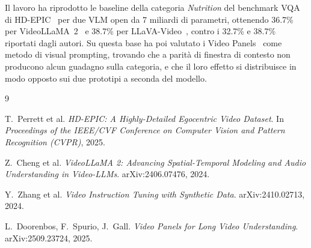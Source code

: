 \documentclass{article}
\begin{document}
Il lavoro ha riprodotto le baseline della categoria \emph{Nutrition} del
benchmark VQA di HD-EPIC~\cite{hdepic} per due VLM open da 7 miliardi di parametri, ottenendo
36.7\% per VideoLLaMA~2~\cite{videollama2} e 38.7\% per LLaVA-Video~\cite{llavavideo}, contro i 32.7\% e 38.7\%
riportati dagli autori. Su questa base ha poi valutato
i Video Panels~\cite{videopanels} come metodo di visual prompting, trovando che a parità di finestra
di contesto non producono alcun guadagno sulla categoria, e che il loro effetto
si distribuisce in modo opposto sui due prototipi a seconda del modello.

\begin{thebibliography}{9}

T.~Perrett et al.
\newblock \emph{HD-EPIC: A Highly-Detailed Egocentric Video Dataset}.
\newblock In \emph{Proceedings of the IEEE/CVF Conference on Computer Vision and
Pattern Recognition (CVPR)}, 2025.

Z.~Cheng et al.
\newblock \emph{VideoLLaMA 2: Advancing Spatial-Temporal Modeling and Audio
Understanding in Video-LLMs}.
\newblock arXiv:2406.07476, 2024.

Y.~Zhang et al.
\newblock \emph{Video Instruction Tuning with Synthetic Data}.
\newblock arXiv:2410.02713, 2024.

L.~Doorenbos, F.~Spurio, J.~Gall.
\newblock \emph{Video Panels for Long Video Understanding}.
\newblock arXiv:2509.23724, 2025.

\end{thebibliography}
\end{document}
